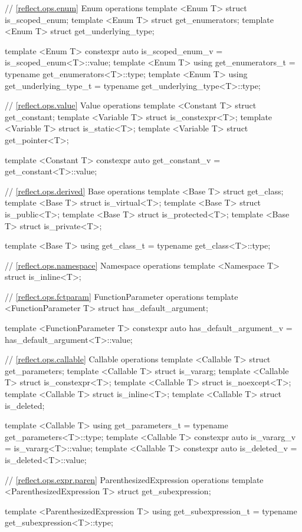 \begin{std.txt}
\begin{codeblock}
{{// \ref{reflect.ops.enum} Enum operations
template <Enum T> struct is_scoped_enum;
template <Enum T> struct get_enumerators;
template <Enum T> struct get_underlying_type;

template <Enum T>
  constexpr auto is_scoped_enum_v = is_scoped_enum<T>::value;
template <Enum T>
  using get_enumerators_t = typename get_enumerators<T>::type;
template <Enum T>
  using get_underlying_type_t = typename get_underlying_type<T>::type;

// \ref{reflect.ops.value} Value operations
template <Constant T> struct get_constant;
template <Variable T> struct is_constexpr<T>;
template <Variable T> struct is_static<T>;
template <Variable T> struct get_pointer<T>;

template <Constant T>
  constexpr auto get_constant_v = get_constant<T>::value;

// \ref{reflect.ops.derived} Base operations
template <Base T> struct get_class;
template <Base T> struct is_virtual<T>;
template <Base T> struct is_public<T>;
template <Base T> struct is_protected<T>;
template <Base T> struct is_private<T>;

template <Base T>
  using get_class_t = typename get_class<T>::type;

// \ref{reflect.ops.namespace} Namespace operations
template <Namespace T> struct is_inline<T>;

// \ref{reflect.ops.fctparam} FunctionParameter operations
template <FunctionParameter T> struct has_default_argument;

template <FunctionParameter T>
  constexpr auto has_default_argument_v = has_default_argument<T>::value;

// \ref{reflect.ops.callable} Callable operations
template <Callable T> struct get_parameters;
template <Callable T> struct is_vararg;
template <Callable T> struct is_constexpr<T>;
template <Callable T> struct is_noexcept<T>;
template <Callable T> struct is_inline<T>;
template <Callable T> struct is_deleted;

template <Callable T>
  using get_parameters_t = typename get_parameters<T>::type;
template <Callable T>
  constexpr auto is_vararg_v = is_vararg<T>::value;
template <Callable T>
  constexpr auto is_deleted_v = is_deleted<T>::value;

// \ref{reflect.ops.expr.paren} ParenthesizedExpression operations
template <ParenthesizedExpression T> struct get_subexpression;

template <ParenthesizedExpression T>
   using get_subexpression_t = typename get_subexpression<T>::type;

}}
\end{codeblock}
\end{std.txt}
